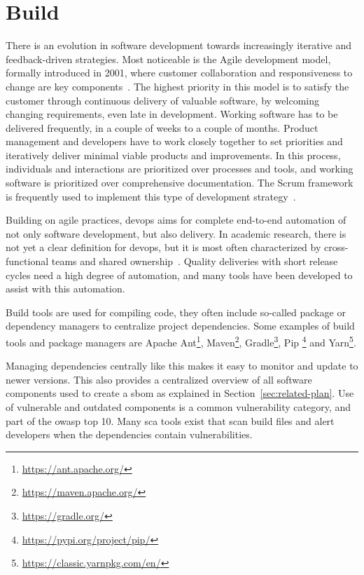 \section{Build}
\label{sec:related-build}

There is an evolution in software development towards increasingly iterative and feedback-driven strategies.
Most noticeable is the Agile development model, formally introduced in 2001, where customer collaboration and responsiveness to change are key components~\cite{fowler2001agile}.
The highest priority in this model is to satisfy the customer through continuous delivery of valuable software, by welcoming changing requirements, even late in development.
Working software has to be delivered frequently, in a couple of weeks to a couple of months.
Product management and developers have to work closely together to set priorities and iteratively deliver minimal viable products and improvements.
In this process, individuals and interactions are prioritized over processes and tools, and working software is prioritized over comprehensive documentation.
The Scrum framework is frequently used to implement this type of development strategy~\cite{schwaber2004agile}.

Building on agile practices, \gls{devops} aims for complete end-to-end automation of not only software development, but also delivery.
In academic research, there is not yet a clear definition for \gls{devops}, but it is most often characterized by cross-functional teams and shared ownership~\cite{erich2017qualitative,ebert2016devops}.
Quality deliveries with short release cycles need a high degree of automation, and many tools have been developed to assist with this automation.

Build tools are used for compiling code, they often include so-called package or dependency managers to centralize project dependencies.
Some examples of build tools and package managers are Apache Ant\footnote{\url{https://ant.apache.org/}}, Maven\footnote{\url{https://maven.apache.org/}}, Gradle\footnote{\url{https://gradle.org/}},
Pip \footnote{\url{https://pypi.org/project/pip/}} and Yarn\footnote{\url{https://classic.yarnpkg.com/en/}}.

Managing dependencies centrally like this makes it easy to monitor and update to newer versions.
This also provides a centralized overview of all software components used to create a \gls{sbom} as explained in Section~\ref{sec:related-plan}.
Use of vulnerable and outdated components is a common vulnerability category, and part of the \gls{owasp} top 10.
Many \gls{sca} tools exist that scan build files and alert developers when the dependencies contain vulnerabilities.

